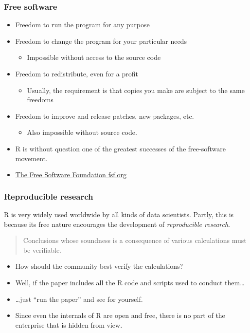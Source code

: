 \documentclass[11pt,ignorenonframetext,]{beamer}
\begin{document}
\begin{frame}\frametitle{Free software}

\begin{itemize}[<+->]
\itemsep1pt\parskip0pt
\item
  Freedom to run the program for any purpose
\item
  Freedom to change the program for your particular needs

  \begin{itemize}[<+->]
  \itemsep1pt\parskip0pt
  \item
    Impossible without access to the source code
  \end{itemize}
\item
  Freedom to redistribute, even for a profit

  \begin{itemize}[<+->]
  \itemsep1pt\parskip0pt
  \item
    Usually, the requirement is that copies you make are subject to the
    same freedoms
  \end{itemize}
\item
  Freedom to improve and release patches, new packages, etc.

  \begin{itemize}[<+->]
  \itemsep1pt\parskip0pt
  \item
    Also impossible without source code.
  \end{itemize}
\item
  R is without question one of the greatest successes of the
  free-software movement.
\item
  \href{http://fsf.org/}{The Free Software Foundation fsf.org}
\end{itemize}

\end{frame}

\begin{frame}\frametitle{Reproducible research}

R is very widely used worldwide by all kinds of data scientists. Partly,
this is because its free nature encourages the development of
\emph{reproducible research}.

\begin{quote}
Conclusions whose soundness is a consequence of various calculations
must be verifiable.
\end{quote}

\begin{itemize}[<+->]
\itemsep1pt\parskip0pt
\item
  How should the community best verify the calculations?
\item
  Well, if the paper includes all the R code and scripts used to conduct
  them\ldots{}
\item
  \ldots{}just ``run the paper'' and see for yourself.
\item
  Since even the internals of R are open and free, there is no part of
  the enterprise that is hidden from view.
\end{itemize}

\end{frame}
\end{document}
